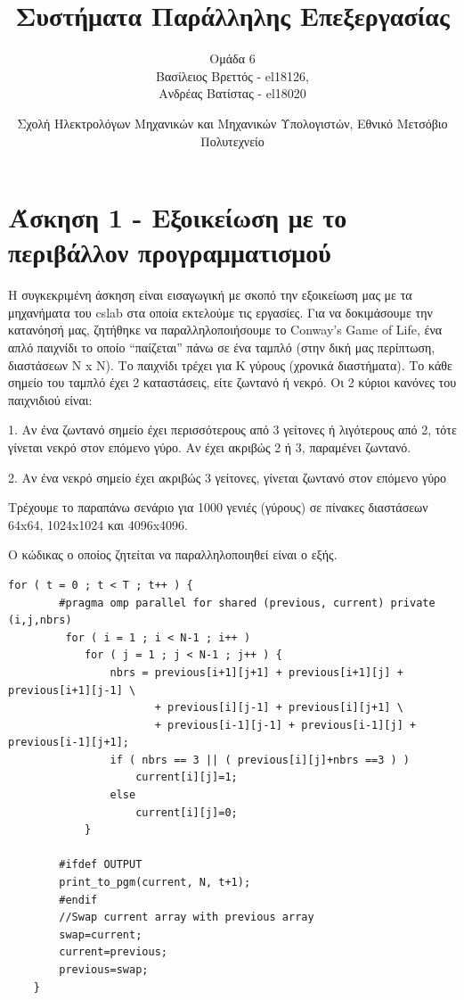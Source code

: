 \documentclass[letterpaper,12pt]{article}
\begin{document}
\graphicspath{{../Lab2/plots/}{../Lab1/plot/}{../Lab3/plots}}

\title{Συστήματα Παράλληλης Επεξεργασίας}
\author{Ομάδα 6 \\
Βασίλειος Βρεττός - el18126, \\
Ανδρέας Βατίστας - el18020 \\}
\date{Σχολή Ηλεκτρολόγων Μηχανικών και Μηχανικών Υπολογιστών, Εθνικό Μετσόβιο Πολυτεχνείο}
\maketitle




\section{Άσκηση 1 - Εξοικείωση με το περιβάλλον προγραμματισμού}
Η συγκεκριμένη άσκηση είναι εισαγωγική με σκοπό την εξοικείωση μας με τα μηχανήματα του cslab στα οποία εκτελούμε τις εργασίες. Για να δοκιμάσουμε την κατανόησή μας, ζητήθηκε να παραλληλοποιήσουμε το Conway’s Game of Life, ένα απλό παιχνίδι το οποίο “παίζεται” πάνω σε ένα ταμπλό (στην δική μας περίπτωση, διαστάσεων N x N). Το παιχνίδι τρέχει για Κ γύρους (χρονικά διαστήματα). Το κάθε σημείο του ταμπλό έχει 2 καταστάσεις, είτε ζωντανό ή νεκρό. Οι 2 κύριοι κανόνες του παιχνιδιού είναι: \newline

1.	Αν ένα ζωντανό σημείο έχει περισσότερους από 3 γείτονες ή λιγότερους από 2, τότε γίνεται νεκρό στον επόμενο γύρο. Αν έχει ακριβώς 2 ή 3, παραμένει ζωντανό. 

2.	Αν ένα νεκρό σημείο έχει ακριβώς 3 γείτονες, γίνεται ζωντανό στον επόμενο γύρο \newline

Τρέχουμε το παραπάνω σενάριο για 1000 γενιές (γύρους) σε πίνακες διαστάσεων 64x64, 1024x1024 και 4096x4096. \newline

Ο κώδικας ο οποίος ζητείται να παραλληλοποιηθεί είναι ο εξής.


\begin{lstlisting}
for ( t = 0 ; t < T ; t++ ) {
        #pragma omp parallel for shared (previous, current) private (i,j,nbrs)
         for ( i = 1 ; i < N-1 ; i++ )
            for ( j = 1 ; j < N-1 ; j++ ) {
                nbrs = previous[i+1][j+1] + previous[i+1][j] + previous[i+1][j-1] \
                       + previous[i][j-1] + previous[i][j+1] \
                       + previous[i-1][j-1] + previous[i-1][j] + previous[i-1][j+1];
                if ( nbrs == 3 || ( previous[i][j]+nbrs ==3 ) )
                    current[i][j]=1;
                else
                    current[i][j]=0;
            }

        #ifdef OUTPUT
        print_to_pgm(current, N, t+1);
        #endif
        //Swap current array with previous array
        swap=current;
        current=previous;
        previous=swap;
    }
\end{lstlisting}
\end{document}
